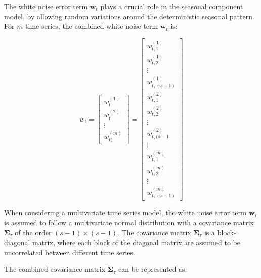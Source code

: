     The white noise error term $\bm{w}_{t}$ plays a crucial role in the seasonal component model,
    by allowing random variations around the deterministic seasonal pattern.
    For $m$ time series, the combined white noise term $\bm{w}_{t}$ is:

    \begin{equation}
        w_t=
            \left[
                \begin{array}{c}
                    w_{t}^{(1)} \\
                    w_{t}^{(2)} \\
                    \vdots \\
                    w_{t)}^{(m)}
                \end{array}
            \right]
           =
            \left[
                \begin{array}{c}
                    w_{t, 1}^{(1)} \\
                    w_{t, 2}^{(1)} \\
                    \vdots \\
                    w_{t, (s-1)}^{(1)} \\
                    w_{t, 1}^{(2)} \\
                    w_{t, 2}^{(2)} \\
                    \vdots \\
                    w_{t, (s-1}^{(2)} \\
                    \vdots \\
                    w_{t, 1}^{(m)} \\
                    w_{t, 2}^{(m)} \\
                    \vdots \\
                    w_{t, (s-1)}^{(m)}
                \end{array}
            \right]
    \label{eq:seasonal_error}
    \end{equation}

    When considering a multivariate time series model, the white noise error term $\bm{w}_{t}$ is assumed to follow
    a multivariate normal distribution with a covariance matrix $\bm{\Sigma}_{\tau}$ of the order $(s-1) \times (s-1)$.
    The covariance matrix $\bm{\Sigma}_{\tau}$ is a block-diagonal matrix, where each block of the diagonal matrix are
    assumed to be uncorrelated between different time series.

    The combined covariance matrix $\bm{\Sigma}_{\tau}$ can be represented as:

